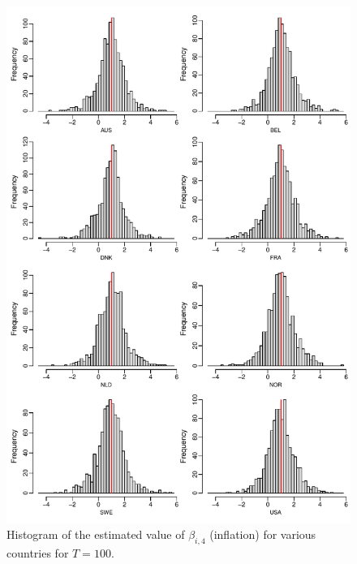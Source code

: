 \documentclass[a4paper,12pt]{article}
\begin{document}
\begin{enumerate}[label=\arabic*.,leftmargin=0.6cm]
{\begin{itemize}[topsep=0pt]
\begin{figure}[p!]
\includegraphics[width=\textwidth]{output/beta_infl_T_100}
\caption{Histogram of the estimated value of $\beta_{i, 4}$ (inflation) for various countries for $T = 100$.}\label{fig:para:infl:100}
\end{figure}
\begin{figure}[p!]

\end{figure}
\end{itemize}}
\end{enumerate}
\end{document}
